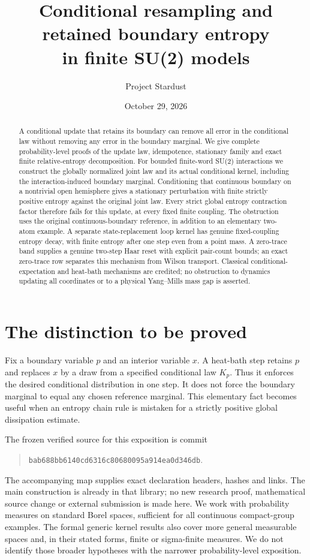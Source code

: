 \documentclass[11pt]{article}
\title{Conditional resampling and retained boundary entropy\\in finite SU(2) models}
\author{Project Stardust}\date{October 29, 2026}
\begin{document}
\maketitle
\begin{abstract}
A conditional update that retains its boundary can remove all error in the
conditional law without removing any error in the boundary marginal. We give
complete probability-level proofs of the update law, idempotence, stationary
family and exact finite relative-entropy decomposition. For bounded finite-word
SU(2) interactions we construct the globally normalized joint law and its
actual conditional kernel, including the interaction-induced boundary marginal.
Conditioning that continuous boundary on a nontrivial open hemisphere gives a
stationary perturbation with finite strictly positive entropy against the
original joint law. Every strict global entropy contraction factor therefore
fails for this update, at every fixed finite coupling. The obstruction uses
the original continuous-boundary reference, in addition to an elementary
two-atom example. A separate state-replacement loop kernel has genuine fixed-coupling entropy
decay, with finite entropy after one step even from a point mass. A zero-trace
band supplies a genuine two-step Haar reset with explicit pair-count bounds;
an exact zero-trace row separates this mechanism from Wilson transport. Classical
conditional-expectation and heat-bath mechanisms
are credited; no obstruction to dynamics updating all coordinates or to a
physical Yang--Mills mass gap is asserted.
\end{abstract}

\section{The distinction to be proved}
Fix a boundary variable $p$ and an interior variable $x$. A heat-bath step
retains $p$ and replaces $x$ by a draw from a specified conditional law
$K_p$. Thus it enforces the desired conditional distribution in one step.
It does not force the boundary marginal to equal any chosen reference
marginal. This elementary fact becomes useful when an entropy chain rule is
mistaken for a strictly positive global dissipation estimate.

The frozen verified source for this exposition is commit
\begin{quote}\small\texttt{bab688bb6140cd6316c80680095a914ea0d346db}.\end{quote}
The accompanying map supplies exact declaration headers, hashes and links.
The main construction is already in that library; no new research proof,
mathematical source change or external submission is made here.
We work with probability measures on standard Borel spaces, sufficient for
all continuous compact-group examples. The formal generic kernel results
also cover more general measurable spaces and, in their stated forms,
finite or sigma-finite measures. We do not identify those broader hypotheses
with the narrower probability-level exposition.
\end{document}
